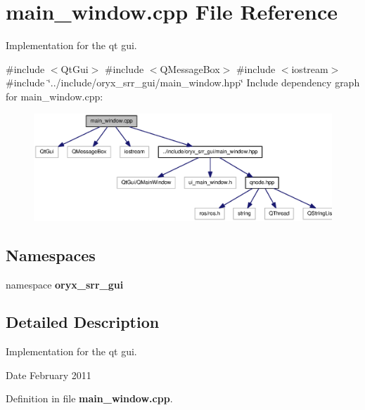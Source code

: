 \section{main\-\_\-window.\-cpp \-File \-Reference}
\label{main__window_8cpp}


\-Implementation for the qt gui.  


{\ttfamily \#include $<$\-Qt\-Gui$>$}\*
{\ttfamily \#include $<$\-Q\-Message\-Box$>$}\*
{\ttfamily \#include $<$iostream$>$}\*
{\ttfamily \#include \char`\"{}../include/oryx\-\_\-srr\-\_\-gui/main\-\_\-window.\-hpp\char`\"{}}\*
\-Include dependency graph for main\-\_\-window.\-cpp\-:
\nopagebreak
\begin{figure}[H]
\begin{center}
\leavevmode
\includegraphics[width=350pt]{main__window_8cpp__incl}
\end{center}
\end{figure}
\subsection*{\-Namespaces}
\begin{DoxyCompactItemize}
\item 
namespace {\bf oryx\-\_\-srr\-\_\-gui}
\end{DoxyCompactItemize}


\subsection{\-Detailed \-Description}
\-Implementation for the qt gui. \begin{DoxyDate}{\-Date}
\-February 2011 
\end{DoxyDate}


\-Definition in file {\bf main\-\_\-window.\-cpp}.

